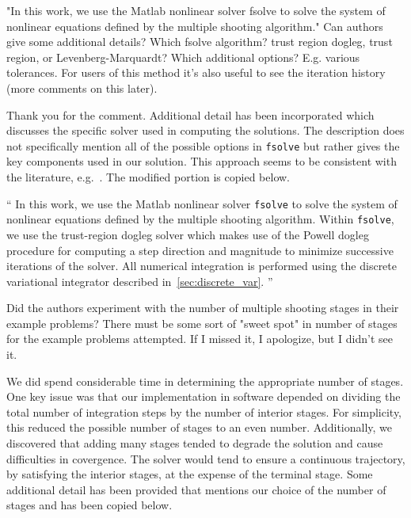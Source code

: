 \documentclass[11pt]{article}
\newenvironment{correction}{\begin{list}{}{\setlength{\leftmargin}{1cm}\setlength{\rightmargin}{1cm}}\vspace{\parsep}\item[]``}{''\end{list}}
\begin{document}
\begin{enumerate}
\item
    \begin{itshape}
"In this work, we use the Matlab nonlinear solver fsolve to solve the system of nonlinear equations defined by the multiple shooting algorithm."  Can authors give some additional details?  Which fsolve algorithm? trust region dogleg,  trust region, or Levenberg-Marquardt?  Which additional options?  E.g. various tolerances.  For users of this method it's also useful to see the iteration history (more comments on this later).
\end{itshape}

Thank you for the comment.
Additional detail has been incorporated which discusses the specific solver used in computing the solutions. 
The description does not specifically mention all of the possible options in \texttt{fsolve} but rather gives the key components used in our solution.
This approach seems to be consistent with the literature, e.g.~\cite{ozimek2010a,stuart2010}.
The modified portion is copied below.

\begin{correction}
In this work, we use the Matlab nonlinear solver \texttt{fsolve} to solve the system of nonlinear equations defined by the multiple shooting algorithm.
Within \texttt{fsolve}, we use the trust-region dogleg solver which makes use of the Powell dogleg procedure for computing a step direction and magnitude to minimize successive iterations of the solver.
All numerical integration is performed using the discrete variational integrator described in~\cref{sec:discrete_var}.
\end{correction}

\item
    \begin{itshape}
Did the authors experiment with the number of multiple shooting stages in their example problems?  There must be some sort of "sweet spot" in number of stages for the example problems attempted.  If I missed it, I apologize, but I didn't see it.
\end{itshape}

We did spend considerable time in determining the appropriate number of stages. 
One key issue was that our implementation in software depended on dividing the total number of integration steps by the number of interior stages.
For simplicity, this reduced the possible number of stages to an even number. 
Additionally, we discovered that adding many stages tended to degrade the solution and cause difficulties in covergence. 
The solver would tend to ensure a continuous trajectory, by satisfying the interior stages, at the expense of the terminal stage. 
Some additional detail has been provided that mentions our choice of the number of stages and has been copied below.


\end{enumerate}
\end{document}
